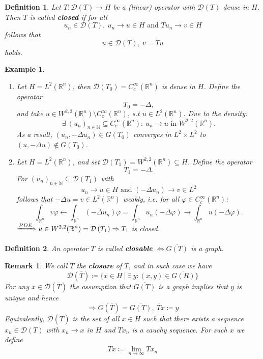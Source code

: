 \documentclass[12pt]{extreport} %
\newcommand{\N}{\mathbb{N}}
\newcommand{\R}{\mathbb{R}}
\newcommand{\DO}[1]{\mathcal{D}\left( {#1} \right)}
\theoremstyle{named}
\theoremstyle{nnamed}
\theoremstyle{itshape}
\newtheorem{definition}{Definition}  \counterwithin{definition}{chapter}
\theoremstyle{normal}
\newtheorem*{example}{Example}
\newtheorem*{remark}{Remark}
\begin{document}
 
\begin{definition} \label{i.1:def}
	Let $T \colon \DO{T} \rightarrow H$ be a (linear) operator with $\DO{T}$ dense in $H$. Then $T$ is called \textbf{closed} if for all 
		$$ u_n \in \DO{T}, ~ u_n \rightarrow u \in H \text{ and } T u_n \rightarrow v \in H $$
	follows that
		$$ u \in \DO{T}, ~ v = T u $$
	holds.
\end{definition}

\begin{example} ~\
	\begin{enumerate}
		\item Let $H = L^2(\R^n)$, then $\DO{T_{0}} = C_c^\infty(\R^n)$ is dense in $H$. Define the operator
			$$ T_0 = - \Delta,  $$
			and take $u \in W^{2,2}(\R^n) \setminus C_c^{\infty}(\R^n)$, s.t $u \in L^2(\R^n)$. Due to the density:
			$$ \exists ~(u_n)_{n \in \N} \subseteq C_c^{\infty}(\R^n) \colon ~ u_n \rightarrow u \text{ in } W^{2,2}(\R^n). $$
			As a result, $\left( u_n, -\Delta u_n \right) \in G(T_0)$ converges in $L^2 \times L^2$ to $(u, -\Delta u) \notin G(T_0)$.
		\item Let $H = L^2(\R^n)$, and set $\DO{T_1} = W^{2,2}(\R^n) \subseteq H$. Define the operator
			$$ T_1 = - \Delta. $$
		 For $(u_n)_{n \in \N} \subseteq \DO{T_1}$ with 
			$$ u_n \rightarrow u \in H \text{ and } \left( - \Delta u_n \right) \rightarrow v \in L^2 $$
			follows that $- \Delta u = v \in L^2(\R^n)$ weakly, i.e. for all $\varphi \in C_c^{\infty}(\R^n)$:
			$$ \int_{\R^n} v \varphi \longleftarrow \int_{\R^n} \left( - \Delta u_n \right) \varphi = \int_{\R^n} u_n \left( - \Delta \varphi \right) \longrightarrow \int_{\R^n} u \left( - \Delta \varphi \right). $$
			$\xRightarrow[]{PDE} u \in W^{2,2}(\R^n) = \DO{T_1} \Rightarrow T_1$ is closed.
	\end{enumerate}
\end{example}

 
\begin{definition}
	An operator $T$ is called \textbf{closable} $\iff \overline{G(T)}$ is a graph.
\end{definition}

 
\begin{remark}
	We call $\overline{T}$ the \textbf{closure} of $T$, and in such case we have 
	$$ \DO{\overline{T}} \coloneqq \big\{ x \in H ~ \big| ~ \exists ~ y \colon (x, y) \in \overline{G(R)} \big\} $$	
	For any $x \in \DO{\overline{T}}$ the assumption that $\overline{G(T)}$ is a graph implies that $y$ is unique and hence
	$$ \Rightarrow G(\overline{T}) = \overline{G(T)}, ~\overline{T} x \coloneqq y $$
	Equivalently, $\DO{\overline{T}}$ is the set of all $x \in H$ such that there exists a sequence $x_n \in \DO{T}$ with $x_n \rightarrow x$ in $H$ and $T x_n$ is a cauchy sequence. For such $x$ we define
	$$ \overline{Tx} \coloneqq \lim_{n \rightarrow \infty} T x_n $$
\end{remark}
\end{document}
